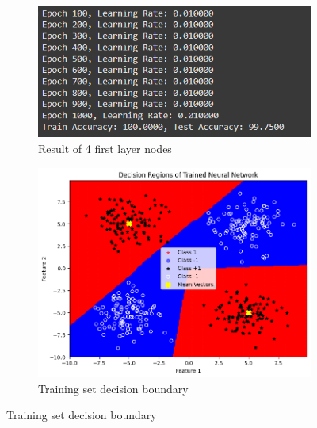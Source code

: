 \documentclass[a4paper,12pt]{article}
\begin{document}
\begin{figure}[H]
    \centering
    \captionsetup[subfigure]{list=true} %

    \begin{subfigure}{0.5\textwidth}
        \centering
        \includegraphics[width=\textwidth]{2.2_4_r.png}
        \caption{Result of 4 first layer nodes}
    \end{subfigure}
    \begin{subfigure}{0.45\textwidth}
        \centering
        \includegraphics[width=\textwidth]{2.2_4_Train.png}
        \caption{Training set decision boundary}
    \end{subfigure}


\end{figure}
\end{document}
